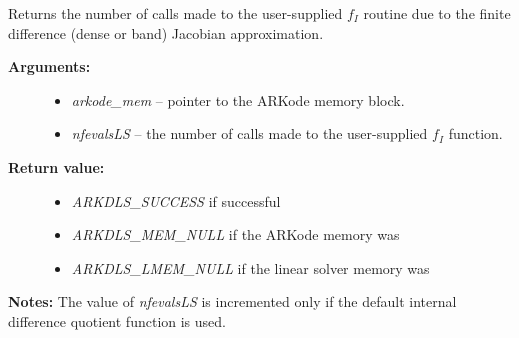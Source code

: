 \documentclass[letterpaper,10pt,english]{sphinxmanual}
\begin{document}
\begin{fulllineitems}
\label{c_interface/User_callable:c.ARKDlsGetNumRhsEvals}
Returns the number of calls made to the user-supplied
\(f_I\) routine due to the finite difference (dense or band)
Jacobian approximation.
\begin{description}
\item[{\textbf{Arguments:}}] \leavevmode\begin{itemize}
\item {} 
\emph{arkode\_mem} -- pointer to the ARKode memory block.

\item {} 
\emph{nfevalsLS} -- the number of calls made to the user-supplied
\(f_I\) function.

\end{itemize}

\item[{\textbf{Return value:}}] \leavevmode\begin{itemize}
\item {} 
\emph{ARKDLS\_SUCCESS} if successful

\item {} 
\emph{ARKDLS\_MEM\_NULL} if the ARKode memory was 

\item {} 
\emph{ARKDLS\_LMEM\_NULL} if the linear solver memory was 

\end{itemize}

\end{description}

\textbf{Notes:} The value of \emph{nfevalsLS} is incremented only if the default
internal difference quotient function is used.

\end{fulllineitems}

\end{document}
